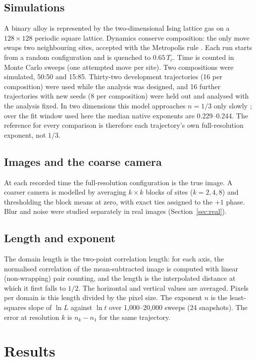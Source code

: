 \documentclass[11pt,a4paper]{article}
\begin{document}
\subsection{Simulations}
A binary alloy is represented by the two-dimensional Ising lattice gas on a
$128\times128$ periodic square lattice. Dynamics conserve composition: the only
move swaps two neighbouring sites, accepted with the Metropolis rule
\cite{kawasaki1966,metropolis1953}. Each run starts from a random configuration
and is quenched to $0.65\,T_c$. Time is counted in Monte Carlo sweeps (one
attempted move per site). Two compositions were simulated, 50:50 and 15:85.
Thirty-two development trajectories (16 per composition) were used while the
analysis was designed, and 16 further trajectories with new seeds (8 per
composition) were held out and analysed with the analysis fixed. In two
dimensions this model approaches $n=1/3$ only slowly \cite{huse1986}; over the
fit window used here the median native exponents are 0.229--0.244. The
reference for every comparison is therefore each trajectory's own
full-resolution exponent, not $1/3$.

\subsection{Images and the coarse camera}
At each recorded time the full-resolution configuration is the true image. A
coarser camera is modelled by averaging $k\times k$ blocks of sites ($k=2,4,8$)
and thresholding the block means at zero, with exact ties assigned to the
$+1$ phase. Blur and noise were studied separately in real images
(Section~\ref{sec:real}).

\subsection{Length and exponent}
The domain length is the two-point correlation length: for each axis, the
normalised correlation of the mean-subtracted image is computed with linear
(non-wrapping) pair counting, and the length is the interpolated distance at
which it first falls to $1/2$. The horizontal and vertical values are
averaged. Pixels per domain is this length divided by the pixel size. The
exponent $n$ is the least-squares slope of $\ln L$ against $\ln t$ over
1{,}000--20{,}000 sweeps (24 snapshots). The error at resolution $k$ is
$n_k-n_1$ for the same trajectory.

\section{Results}
\end{document}
